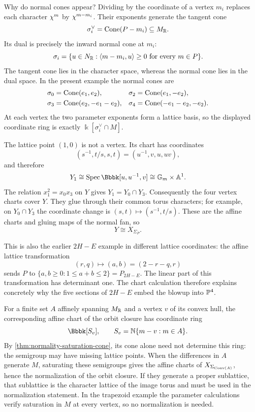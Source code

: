 \begin{example}
Why do normal cones appear? Dividing by the coordinate of a vertex
\(m_i\) replaces each character \(\chi^{m}\) by
\(\chi^{m-m_i}\). Their exponents generate the tangent cone
\[
\sigma_i^\vee=\operatorname{Cone}(P-m_i)\subseteq M_{\mathbb{R}}.
\]
Its dual is precisely the inward normal cone at \(m_i\):
\[
\sigma_i=\{u\in N_{\mathbb{R}}:
\langle m-m_i,u\rangle\geq0\text{ for every }m\in P\}.
\]
The tangent cone lies in the character space, whereas the normal
cone lies in the dual space. In the present example the normal cones
are
\[
\begin{aligned}
\sigma_0&=\operatorname{Cone}(e_1,e_2),&
\sigma_2&=\operatorname{Cone}(e_1,-e_2),\\
\sigma_3&=\operatorname{Cone}(e_2,-e_1-e_2),&
\sigma_4&=\operatorname{Cone}(-e_1-e_2,-e_2).
\end{aligned}
\]
At each vertex the two parameter exponents form a lattice basis, so
the displayed coordinate ring is exactly
\(\Bbbk[\sigma_i^\vee\cap M]\).

The lattice point \((1,0)\) is not a vertex. Its chart has coordinates
\[
(s^{-1},t/s,s,t)=(u^{-1},v,u,uv),
\]
and therefore
\[
Y_1\cong\Spec\Bbbk[u,u^{-1},v]\cong\Gm\times\AAA^1.
\]
The relation \(x_1^2=x_0x_3\) on \(Y\) gives
\(Y_1=Y_0\cap Y_3\). Consequently the four vertex charts cover \(Y\).
They glue through their common torus characters; for example, on
\(Y_0\cap Y_3\) the coordinate change is
\((s,t)\mapsto(s^{-1},t/s)\). These are the affine charts and gluing
maps of the normal fan, so
\[
Y\cong X_{\Sigma_P}.
\]

This is also the earlier \(2H-E\) example in different lattice
coordinates: the affine lattice transformation
\[
(r,q)\longmapsto(a,b)=(2-r-q,r)
\]
sends \(P\) to
\(\{a,b\geq0:1\leq a+b\leq2\}=P_{2H-E}\).
The linear part of this transformation has determinant one. The chart
calculation therefore explains concretely why the five sections of
\(2H-E\) embed the blowup into \(\mathbb{P}^4\).
\end{example}

\begin{observation}
\label{obs:classroom-vertex-semigroups}
For a finite set \(A\) affinely spanning \(M_{\mathbb{R}}\) and a vertex
\(v\) of its convex hull, the
corresponding affine chart of the orbit closure has coordinate ring
\[
\Bbbk[S_v],\qquad S_v=\NN\{m-v:m\in A\}.
\]
By \cref{thm:normality-saturation-cone}, its cone alone need not determine this ring: the semigroup may have
missing lattice points. When the differences in \(A\) generate \(M\),
saturating these semigroups gives the affine charts of
\(X_{\Sigma_{\operatorname{Conv}(A)}}\), hence the normalization of
the orbit closure. If they generate a proper sublattice, that
sublattice is the character lattice of the image torus and must be
used in the normalization statement. In the trapezoid example the
parameter calculations verify saturation in \(M\) at every vertex,
so no normalization is needed.
\end{observation}

